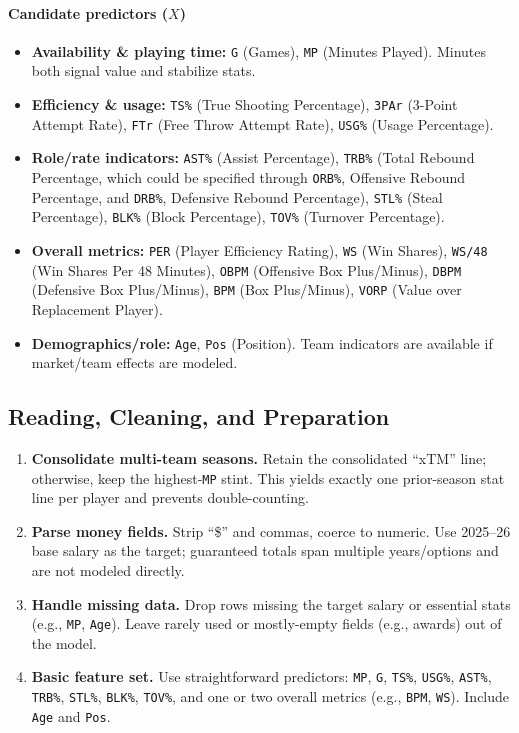 \documentclass{article}
\theoremstyle{plain}
\theoremstyle{definition}
\theoremstyle{remark}
\begin{document}
\paragraph{Candidate predictors (\(X\))}
\begin{itemize}
    \item \textbf{Availability \& playing time:} \texttt{G} (Games), \texttt{MP} (Minutes Played). Minutes both signal value and stabilize stats.
    \item \textbf{Efficiency \& usage:} \texttt{TS\%} (True Shooting Percentage), \texttt{3PAr} (3-Point Attempt Rate), \texttt{FTr} (Free Throw Attempt Rate), \texttt{USG\%} (Usage Percentage).
    \item \textbf{Role/rate indicators:} \texttt{AST\%} (Assist Percentage), \texttt{TRB\%} (Total Rebound Percentage, which could be specified through \texttt{ORB\%}, Offensive Rebound Percentage, and \texttt{DRB\%}, Defensive Rebound Percentage), \texttt{STL\%} (Steal Percentage), \texttt{BLK\%} (Block Percentage), \texttt{TOV\%} (Turnover Percentage).
    \item \textbf{Overall metrics:} \texttt{PER} (Player Efficiency Rating), \texttt{WS} (Win Shares), \texttt{WS/48} (Win Shares Per 48 Minutes), \texttt{OBPM} (Offensive Box Plus/Minus), \texttt{DBPM} (Defensive Box Plus/Minus), \texttt{BPM} (Box Plus/Minus), \texttt{VORP} (Value over Replacement Player).
    \item \textbf{Demographics/role:} \texttt{Age}, \texttt{Pos} (Position). Team indicators are available if market/team effects are modeled.
\end{itemize}

\subsection*{Reading, Cleaning, and Preparation}
\begin{enumerate}
    \item \textbf{Consolidate multi-team seasons.} Retain the consolidated ``xTM'' line; otherwise, keep the highest-\texttt{MP} stint. This yields exactly one prior-season stat line per player and prevents double-counting.
    \item \textbf{Parse money fields.} Strip ``\$'' and commas, coerce to numeric. Use 2025--26 base salary as the target; guaranteed totals span multiple years/options and are not modeled directly.
    \item \textbf{Handle missing data.} Drop rows missing the target salary or essential stats (e.g., \texttt{MP}, \texttt{Age}). Leave rarely used or mostly-empty fields (e.g., awards) out of the model.
    \item \textbf{Basic feature set.} Use straightforward predictors: \texttt{MP}, \texttt{G}, \texttt{TS\%}, \texttt{USG\%}, \texttt{AST\%}, \texttt{TRB\%}, \texttt{STL\%}, \texttt{BLK\%}, \texttt{TOV\%}, and one or two overall metrics (e.g., \texttt{BPM}, \texttt{WS}). Include \texttt{Age} and \texttt{Pos}.
\end{enumerate}
\end{document}
